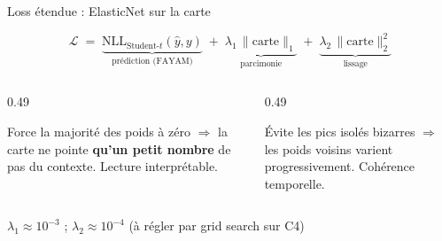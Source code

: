 \documentclass[10pt]{beamer}
\begin{document}
\begin{frame}{Loss étendue : ElasticNet sur la carte}
  \begin{tcolorbox}[colback=blue!3, colframe=blue!50!black, arc=3mm,
                    fonttitle=\bfseries, title=Loss totale]
    \[
      \mathcal{L} \;=\; \underbrace{\text{NLL}_{\text{Student-}t}(\hat y, y)}_{\text{prédiction (FAYAM)}}
      \;+\; \underbrace{\lambda_1\,\|\text{carte}\|_1}_{\text{parcimonie}}
      \;+\; \underbrace{\lambda_2\,\|\text{carte}\|_2^2}_{\text{lissage}}
    \]
  \end{tcolorbox}

  \begin{columns}
    \begin{column}{0.49\textwidth}
      \begin{tcolorbox}[colback=orange!3, colframe=orange!60!black, arc=2mm,
                        fonttitle=\bfseries, title={$\ell_1$ — parcimonie}]
        Force la majorité des poids à zéro $\Rightarrow$ la carte ne pointe \textbf{qu'un petit nombre} de pas du contexte.
        Lecture interprétable.
      \end{tcolorbox}
    \end{column}
    \begin{column}{0.49\textwidth}
      \begin{tcolorbox}[colback=green!3, colframe=green!50!black, arc=2mm,
                        fonttitle=\bfseries, title={$\ell_2$ — lissage}]
        Évite les pics isolés bizarres $\Rightarrow$ les poids voisins varient progressivement.
        Cohérence temporelle.
      \end{tcolorbox}
    \end{column}
  \end{columns}

  \begin{tcolorbox}[colback=newcontrib!5, colframe=newcontrib!70!black, arc=2mm,
                    fonttitle=\bfseries, title=Hyperparamètres de départ (transposés de SoftCAM CNN)]
    \centering
    $\lambda_1 \approx 10^{-3}$ \quad ; \quad $\lambda_2 \approx 10^{-4}$ \quad (à régler par grid search sur C4)
  \end{tcolorbox}
\end{frame}
\end{document}
